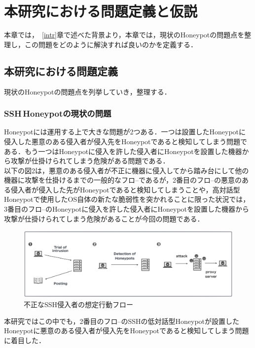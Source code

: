 \chapter{本研究における問題定義と仮説}
\label{appr}

本章では，~\ref{intr}章で述べた背景より，本章では，現状のHoneypotの問題点を整理し，この問題をどのように解決すれば良いのかを定義する．

\section{本研究における問題定義}
\label{appr:problem}
現状のHoneypotの問題点を列挙していき，整理する．

\subsection{SSH\,Honeypotの現状の問題}
\label{appr:problemofSshHoneypot}
Honeypotには運用する上で大きな問題が2つある．一つは設置したHoneypotに侵入した悪意のある侵入者が侵入先をHoneypotであると検知してしまう問題である．もう一つはHoneypotに侵入を許した侵入者にHoneypotを設置した機器から攻撃が仕掛けられてしまう危険がある問題である．\\
以下の図2は，悪意のある侵入者が不正に機器に侵入してから踏み台にして他の機器に攻撃を仕掛けるまでの一般的なフロ--であるが，2番目のフロ--の悪意のある侵入者が侵入した先がHoneypotであると検知してしまうことや，高対話型Honeypotで使用したOS自体の新たな脆弱性を突かれることに限った状況では，3番目のフロ--のHoneypotに侵入を許した侵入者にHoneypotを設置した機器から攻撃が仕掛けられてしまう危険があることが今回の問題である．

\vspace{10mm}
\begin{figure}[H]
    \centering
    \includegraphics[width=1.0\textwidth]{figures/nagare.png}
    \caption{不正なSSH侵入者の想定行動フロー}
    \label{fig:evo}
\end{figure}

本研究ではこの中でも，2番目のフロ--のSSHの低対話型Honeypotが設置したHoneypotに悪意のある侵入者が侵入先をHoneypotであると検知してしまう問題に着目した．

